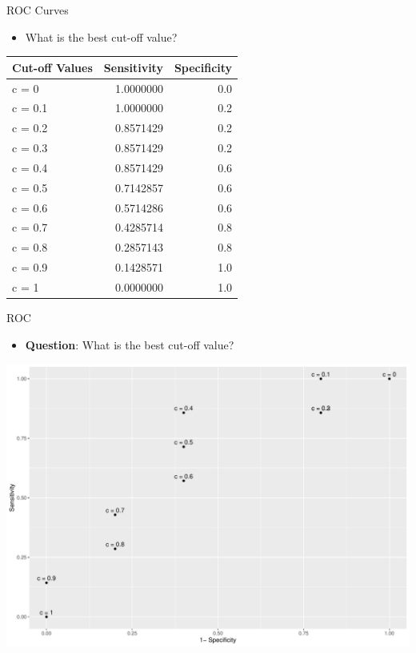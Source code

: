 \documentclass[
  ignorenonframetext,
]{beamer}
\providecommand{\tightlist}{%
  \setlength{\itemsep}{0pt}\setlength{\parskip}{0pt}}
\begin{document}
\begin{frame}{ROC Curves}
\protect\hypertarget{roc-curves-1}{}

\begin{itemize}
\tightlist
\item
  What is the best cut-off value?
\end{itemize}

\begin{longtable}[]{@{}lrr@{}}
\toprule
Cut-off Values & Sensitivity & Specificity\tabularnewline
\midrule
\endhead
c = 0 & 1.0000000 & 0.0\tabularnewline
c = 0.1 & 1.0000000 & 0.2\tabularnewline
c = 0.2 & 0.8571429 & 0.2\tabularnewline
c = 0.3 & 0.8571429 & 0.2\tabularnewline
c = 0.4 & 0.8571429 & 0.6\tabularnewline
c = 0.5 & 0.7142857 & 0.6\tabularnewline
c = 0.6 & 0.5714286 & 0.6\tabularnewline
c = 0.7 & 0.4285714 & 0.8\tabularnewline
c = 0.8 & 0.2857143 & 0.8\tabularnewline
c = 0.9 & 0.1428571 & 1.0\tabularnewline
c = 1 & 0.0000000 & 1.0\tabularnewline
\bottomrule
\end{longtable}

\end{frame}

\begin{frame}{ROC}
\protect\hypertarget{roc}{}

\begin{itemize}
\tightlist
\item
  \textbf{Question}: What is the best cut-off value?
\end{itemize}

\includegraphics{fa_measuring_performance2_files/figure-beamer/unnamed-chunk-4-1.pdf}

\end{frame}
\end{document}
